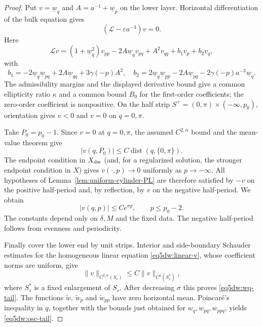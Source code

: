 \documentclass[11pt,reqno]{amsart}
\numberwithin{equation}{section}
\theoremstyle{definition}
\theoremstyle{remark}
\begin{document}
\begin{proof}
Put $v=\underline w_q$ and $A=a^{-1}+\underline w_p$ on the lower
layer.  Horizontal differentiation of the bulk equation gives
\begin{equation}\label{eq5dw:linear-v}
 (\mathscr L-\varepsilon a^{-3})v=0.
\end{equation}
Here
\[
 \mathscr Lv=(1+\underline w_q^2)v_{pp}
 -2A\underline w_qv_{pq}+A^2v_{qq}+b_1v_p+b_2v_q,
\]
with
\[
 b_1=-2\underline w_q\underline w_{pq}
     +2A\underline w_{qq}+3\gamma(-p)A^2,
 \quad
 b_2=2\underline w_q\underline w_{pp}
     -2A\underline w_{pq}-2\gamma(-p)a^{-3}\underline w_q.
\]
The admissibility margins and the displayed derivative bound give a
common ellipticity ratio $\kappa$ and a common bound $B_0$ for the
first-order coefficients; the zero-order coefficient is
nonpositive.  On the half strip
$S^+=(0,\pi)\times(-\infty,p_0)$, orientation gives $v<0$ and
$v=0$ on $q=0,\pi$.

Take $P_0=p_0-1$.  Since $v=0$ at $q=0,\pi$, the assumed
$C^{2,\alpha}$ bound and the mean-value theorem give
\[
 |v(q,P_0)|\le C\operatorname{dist}(q,\{0,\pi\}).
\]
The endpoint condition in $X_{\rm dw}$ (and, for a regularized
solution, the stronger endpoint condition in $X$) gives
$v(\cdot,p)\to0$ uniformly as $p\to-\infty$.  All hypotheses of
Lemma~\ref{lem:uniform-cylinder-PL} are therefore satisfied by
$-v$ on the positive half-period and, by reflection, by $v$ on the
negative half-period.  We obtain
\[
 |v(q,p)|\le Ce^{\sigma p},\qquad p\le p_0-2.
\]
The constants depend only on $\delta,M$ and the fixed data.  The
negative half-period follows from evenness and periodicity.

Finally cover the lower end by unit strips.  Interior and side-boundary
Schauder estimates for the homogeneous linear equation
\eqref{eq5dw:linear-v}, whose coefficient norms are uniform, give
\[
 \|v\|_{C^{2,\alpha}(S_s)}
 \le C\|v\|_{C^0(S_s^*)},
\]
where $S_s^*$ is a fixed enlargement of $S_s$.  After decreasing
$\sigma$ this proves \eqref{eq5dw:wq-tail}.  The functions
$\widetilde w$, $\widetilde w_p$ and $\widetilde w_{pp}$ have zero
horizontal mean.  Poincar\'e's inequality in $q$, together with the
bounds just obtained for $w_q,w_{pq},w_{ppq}$, yields
\eqref{eq5dw:osc-tail}.
\end{proof}
\end{document}
